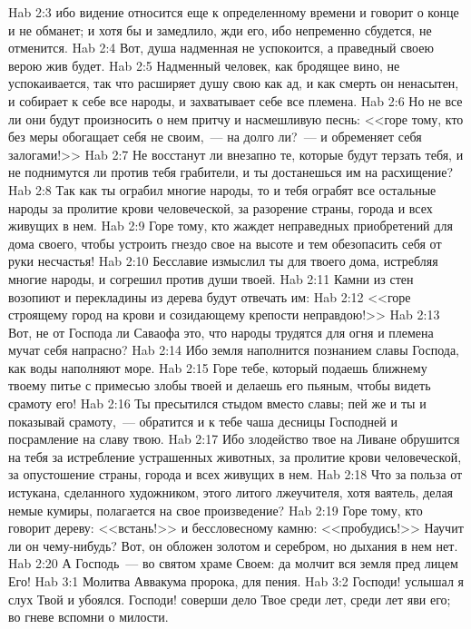 \vs Hab 2:3 ибо видение относится еще к определенному времени и говорит о конце и не обманет; и хотя бы и замедлило, жди его, ибо непременно сбудется, не отменится.
\vs Hab 2:4 Вот, душа надменная не успокоится, а праведный своею верою жив будет.
\vs Hab 2:5 Надменный человек, как бродящее вино, не успокаивается, так что расширяет душу свою как ад, и как смерть он ненасытен, и собирает к себе все народы, и захватывает себе все племена.
\vs Hab 2:6 Но не все ли они будут произносить о нем притчу и насмешливую песнь: <<горе тому, кто без меры обогащает себя не своим,~--- на долго ли?~--- и обременяет себя залогами!>>
\vs Hab 2:7 Не восстанут ли внезапно те, которые будут терзать тебя, и не поднимутся ли против тебя грабители, и ты достанешься им на расхищение?
\vs Hab 2:8 Так как ты ограбил многие народы, то и тебя ограбят все остальные народы за пролитие крови человеческой, за разорение страны, города и всех живущих в нем.
\rsbpar\vs Hab 2:9 Горе тому, кто жаждет неправедных приобретений для дома своего, чтобы устроить гнездо свое на высоте и тем обезопасить себя от руки несчастья!
\vs Hab 2:10 Бесславие измыслил ты для твоего дома, истребляя многие народы, и согрешил против души твоей.
\vs Hab 2:11 Камни из стен возопиют и перекладины из дерева будут отвечать им:
\vs Hab 2:12 <<горе строящему город на крови и созидающему крепости неправдою!>>
\vs Hab 2:13 Вот, не от Господа ли Саваофа это, что народы трудятся для огня и племена мучат себя напрасно?
\vs Hab 2:14 Ибо земля наполнится познанием славы Господа, как воды наполняют море.
\vs Hab 2:15 Горе тебе, который подаешь ближнему твоему питье с примесью злобы твоей и делаешь его пьяным, чтобы видеть срамоту его!
\vs Hab 2:16 Ты пресытился стыдом вместо славы; пей же и ты и показывай срамоту,~--- обратится и к тебе чаша десницы Господней и посрамление на славу твою.
\vs Hab 2:17 Ибо злодейство твое на Ливане обрушится на тебя за истребление устрашенных животных, за пролитие крови человеческой, за опустошение страны, города и всех живущих в нем.
\vs Hab 2:18 Что за польза от истукана, сделанного художником, этого литого лжеучителя, хотя ваятель, делая немые кумиры, полагается на свое произведение?
\vs Hab 2:19 Горе тому, кто говорит дереву: <<встань!>> и бессловесному камню: <<пробудись!>> Научит ли он чему-нибудь? Вот, он обложен золотом и серебром, но дыхания в нем нет.
\vs Hab 2:20 А Господь~--- во святом храме Своем: да молчит вся земля пред лицем Его!
\vs Hab 3:1 Молитва Аввакума пророка, для пения.
\vs Hab 3:2 Господи! услышал я слух Твой и убоялся. Господи! соверши дело Твое среди лет, среди лет яви его; во гневе вспомни о милости.
